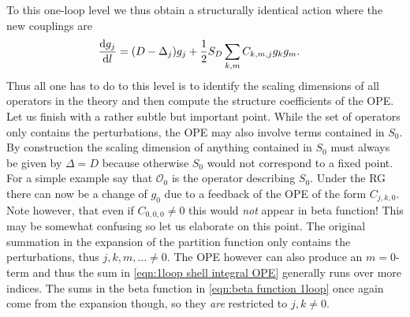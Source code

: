 \documentclass[english, parskip=full]{scrartcl}
\begin{document}
To this one-loop level we thus obtain a structurally identical action where the new couplings are
\begin{align}
\frac{\text{d} g_j}{\text{d} l} &= (D - \Delta_j)g_j + \frac{1}{2} S_D \sum_{k,m} C_{k,m,j} g_k g_m.\label{eqn:beta function 1loop}
\end{align}
Thus all one has to do to this level is to identify the scaling dimensions of all operators in the theory and then compute the structure coefficients of the OPE.\\
Let us finish with a rather subtle but important point.
While the set of operators only contains the perturbations, the OPE may also involve terms contained in $S_0$.
By construction the scaling dimension of anything contained in $S_0$ must always be given by $\Delta=D$ because otherwise $S_0$ would not correspond to a fixed point.
For a simple example say that $\mathcal{O}_0$ is the operator describing $S_0$.
Under the RG there can now be a change of $g_0$ due to a feedback of the OPE of the form $C_{j,k,0}$.
Note however, that even if $C_{0,0,0} \neq 0$ this would \emph{not} appear in beta function!
This may be somewhat confusing so let us elaborate on this point.
The original summation in the expansion of the partition function only contains the perturbations, thus $j,k,m,\dots\neq 0$.
The OPE however can also produce an $m=0$-term and thus the sum in \autoref{eqn:1loop shell integral OPE} generally runs over more indices.
The sums in the beta function in \autoref{eqn:beta function 1loop} once again come from the expansion though, so they \emph{are} restricted to $j,k\neq 0$.
\end{document}
